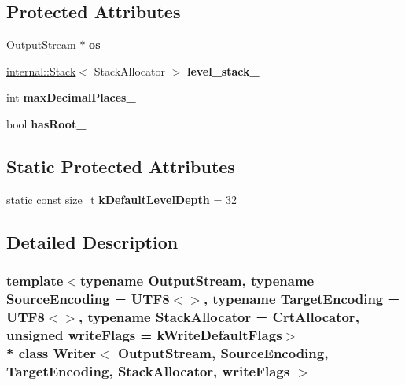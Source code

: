 \subsection*{Protected Attributes}
\begin{DoxyCompactItemize}
\item 
Output\+Stream $\ast$ {\bfseries os\+\_\+}\hypertarget{a00335_a3a3f60140f78dd67b5274978fd3a33ff}{}\label{a00335_a3a3f60140f78dd67b5274978fd3a33ff}

\item 
\hyperlink{a00283}{internal\+::\+Stack}$<$ Stack\+Allocator $>$ {\bfseries level\+\_\+stack\+\_\+}\hypertarget{a00335_a9e6c13c06fc721dfd8486f17b9ff29de}{}\label{a00335_a9e6c13c06fc721dfd8486f17b9ff29de}

\item 
int {\bfseries max\+Decimal\+Places\+\_\+}\hypertarget{a00335_a3d4ef664c3cdf34a286b13d27adcdd4d}{}\label{a00335_a3d4ef664c3cdf34a286b13d27adcdd4d}

\item 
bool {\bfseries has\+Root\+\_\+}\hypertarget{a00335_affc6b9e0332b50bee0d33f8b1841c9a6}{}\label{a00335_affc6b9e0332b50bee0d33f8b1841c9a6}

\end{DoxyCompactItemize}
\subsection*{Static Protected Attributes}
\begin{DoxyCompactItemize}
\item 
static const size\+\_\+t {\bfseries k\+Default\+Level\+Depth} = 32\hypertarget{a00335_a9cb4caeb9d8971f305edff1d70e67acb}{}\label{a00335_a9cb4caeb9d8971f305edff1d70e67acb}

\end{DoxyCompactItemize}


\subsection{Detailed Description}
\subsubsection*{template$<$typename Output\+Stream, typename Source\+Encoding = U\+T\+F8$<$$>$, typename Target\+Encoding = U\+T\+F8$<$$>$, typename Stack\+Allocator = Crt\+Allocator, unsigned write\+Flags = k\+Write\+Default\+Flags$>$\\*
class Writer$<$ Output\+Stream, Source\+Encoding, Target\+Encoding, Stack\+Allocator, write\+Flags $>$}

